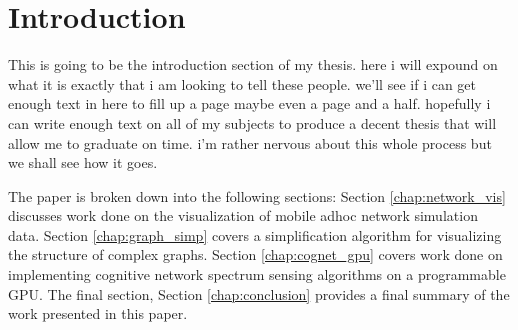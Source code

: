 \chapter{Introduction}
This is going to be the introduction section of my thesis.  here i will expound on what it is exactly that i am looking to tell these people.  we'll see if i can get enough text in here to fill up a page maybe even a page and a half.  hopefully i can write enough text on all of my subjects to produce a decent thesis that will allow me to graduate on time.  i'm rather nervous about this whole process but we shall see how it goes.

The paper is broken down into the following sections:  Section \ref{chap:network_vis} discusses work done on the visualization of mobile adhoc network simulation data.  Section \ref{chap:graph_simp} covers a simplification algorithm for visualizing the structure of complex graphs.  Section \ref{chap:cognet_gpu} covers work done on implementing cognitive network spectrum sensing algorithms on a programmable GPU.  The final section, Section \ref{chap:conclusion} provides a final summary of the work presented in this paper.
